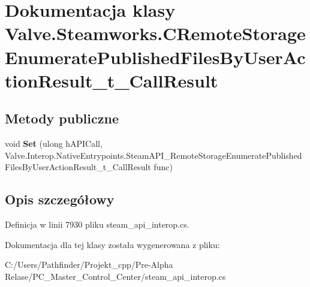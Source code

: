 \hypertarget{class_valve_1_1_steamworks_1_1_c_remote_storage_enumerate_published_files_by_user_action_result__t___call_result}{}\section{Dokumentacja klasy Valve.\+Steamworks.\+C\+Remote\+Storage\+Enumerate\+Published\+Files\+By\+User\+Action\+Result\+\_\+t\+\_\+\+Call\+Result}
\label{class_valve_1_1_steamworks_1_1_c_remote_storage_enumerate_published_files_by_user_action_result__t___call_result}
\subsection*{Metody publiczne}
\begin{DoxyCompactItemize}
\item 
\mbox{\label{class_valve_1_1_steamworks_1_1_c_remote_storage_enumerate_published_files_by_user_action_result__t___call_result_a3172c1caf91b966dceffdf4fab8d8b2e}} 
void {\bfseries Set} (ulong h\+A\+P\+I\+Call, Valve.\+Interop.\+Native\+Entrypoints.\+Steam\+A\+P\+I\+\_\+\+Remote\+Storage\+Enumerate\+Published\+Files\+By\+User\+Action\+Result\+\_\+t\+\_\+\+Call\+Result func)
\end{DoxyCompactItemize}


\subsection{Opis szczegółowy}


Definicja w linii 7930 pliku steam\+\_\+api\+\_\+interop.\+cs.



Dokumentacja dla tej klasy została wygenerowana z pliku\+:\begin{DoxyCompactItemize}
\item 
C\+:/\+Users/\+Pathfinder/\+Projekt\+\_\+cpp/\+Pre-\/\+Alpha Relase/\+P\+C\+\_\+\+Master\+\_\+\+Control\+\_\+\+Center/steam\+\_\+api\+\_\+interop.\+cs\end{DoxyCompactItemize}
